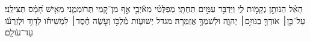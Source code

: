 \documentclass{openreader}
\begin{document}
הָאֵ֗ל הַנֹּותֵ֣ן נְקָמֹ֣ות לִ֑י וַיַּדְבֵּ֖ר עַמִּ֣ים תַּחְתָּֽי׃ 
מְפַלְּטִ֗י מֵאֹ֫יְבָ֥י אַ֣ף מִן־קָ֭מַי תְּרֹומְמֵ֑נִי מֵאִ֥ישׁ חָ֝מָ֗ס תַּצִּילֵֽנִי׃ 
עַל־כֵּ֤ן׀ אֹודְךָ֖ בַגֹּויִ֥ם׀ יְהוָ֑ה וּלְשִׁמְךָ֥ אֲזַמֵּֽרָה׃ 
מגדל יְשׁוּעֹ֢ות מַ֫לְכֹּ֥ו וְעֹ֤שֶׂה חֶ֨סֶד׀ לִמְשִׁיחֹ֗ו לְדָוִ֥ד וּלְזַרְעֹ֗ו עַד־עֹולָֽם׃ 
\end{document}
